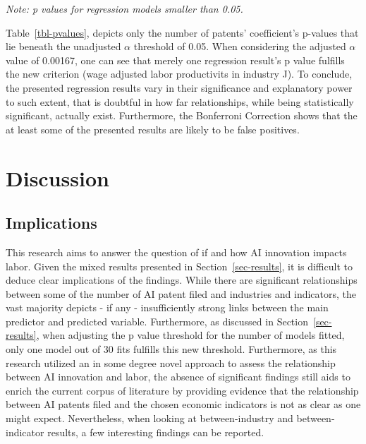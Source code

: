 \documentclass[
  12pt,
  a4paperpaper,
]{article}
\begin{document}
\vspace{-1.5em}\begin{flushleft}\hspace{3cm}\footnotesize\textit{Note: p values for regression models smaller than 0.05.}\end{flushleft}


Table~\ref{tbl-pvalues}, depicts only the number of patents'
coefficient's p-values that lie beneath the unadjusted \(\alpha\)
threshold of 0.05. When considering the adjusted \(\alpha\) value of
0.00167, one can see that merely one regression result's p value
fulfills the new criterion (wage adjusted labor productivits in industry
J). To conclude, the presented regression results vary in their
significance and explanatory power to such extent, that is doubtful in
how far relationships, while being statistically significant, actually
exist. Furthermore, the Bonferroni Correction shows that the at least
some of the presented results are likely to be false positives.

\section{Discussion}\label{sec-discussion}

\subsection{Implications}\label{sec-implications}

This research aims to answer the question of if and how AI innovation
impacts labor. Given the mixed results presented in
Section~\ref{sec-results}, it is difficult to deduce clear implications
of the findings. While there are significant relationships between some
of the number of AI patent filed and industries and indicators, the vast
majority depicts - if any - insufficiently strong links between the main
predictor and predicted variable. Furthermore, as discussed in
Section~\ref{sec-results}, when adjusting the p value threshold for the
number of models fitted, only one model out of 30 fits fulfills this new
threshold. Furthermore, as this research utilized an in some degree
novel approach to assess the relationship between AI innovation and
labor, the absence of significant findings still aids to enrich the
current corpus of literature by providing evidence that the relationship
between AI patents filed and the chosen economic indicators is not as
clear as one might expect. Nevertheless, when looking at
between-industry and between-indicator results, a few interesting
findings can be reported.
\end{document}

